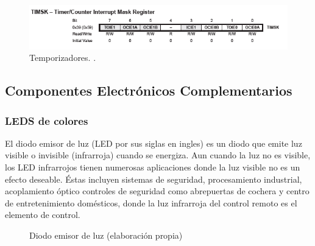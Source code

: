 \documentclass[12pt,letterpaper]{article}     %
\begin{document}
\begin{figure}[H]
    \centering
    \includegraphics[width=1.0\textwidth]{imagenes/8.PNG}
    \caption{Temporizadores. \cite{Microchip}.}
    \label{F:Temp}
    \end{figure}

    


\subsection{Componentes Electr\'onicos Complementarios}
\subsubsection{LEDS de colores}
El diodo emisor de luz (LED por sus siglas en ingles) es un diodo que emite luz visible o invisible (infrarroja) cuando se energiza. Aun cuando la luz no es visible, los LED infrarrojos tienen numerosas aplicaciones donde la
luz visible no es un efecto deseable. Éstas incluyen sistemas de seguridad, procesamiento industrial, acoplamiento óptico controles de seguridad como abrepuertas de cochera y centro de entretenimiento domésticos, donde la luz infrarroja del control remoto es el elemento de control. \cite{boylestad}

\begin{figure}[H]
 \centering
 \caption{Diodo emisor de luz (elaboración propia)}
 \label{f:LED}
\end{figure}
\end{document}

